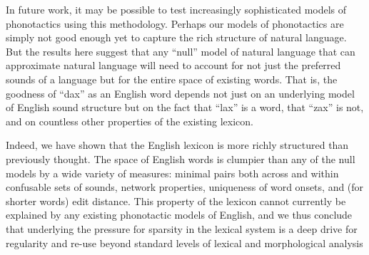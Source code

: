 \documentclass{article}
\begin{document}
In future work, it may be possible to test increasingly sophisticated models of phonotactics using this
methodology. Perhaps our models of phonotactics are simply not good enough yet to capture the rich structure
of natural language. But the results here suggest that any ``null'' model of natural language that can
approximate natural language will need to account for not just the preferred sounds of a language but for the
entire space of existing words. That is, the goodness of ``dax'' as an English word depends not just on an
underlying model of English sound structure but on the fact that ``lax'' is a word, that ``zax'' is not, and
on countless other properties of the existing lexicon.

Indeed, we have shown that the English lexicon is more richly structured than previously thought. The space of
English words is clumpier than any of the null models by a wide variety of measures: minimal pairs both across
and within confusable sets of sounds, network properties, uniqueness of word onsets, and (for shorter words)
edit distance. This property of the lexicon cannot currently be explained by any existing phonotactic models
of English, and we thus conclude that underlying the pressure for sparsity in the lexical system is a deep
drive for regularity and re-use beyond standard levels of lexical and morphological analysis







\end{document}
